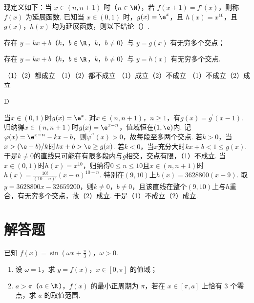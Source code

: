 \begin{problem}
现定义如下：当 \(x\in(n,n+1)\) 时（\(n\in \N\)），若 \(f(x+1)=f'(x)\)，则称 \(f(x)\) 为延展函数. 已知当 \(x\in(0,1)\) 时，\(g(x)=\e^x\)，且 \(h(x)=x^{10}\)，且 \(g(x)\)，\(h(x)\) 均为延展函数，则以下结论（\quad）.

\begin{circlelist}
\item 存在 \(y=kx+b\)（\(k\)，\(b\in\R\)，\(k\)，\(b\ne 0\)）与 \(y=g(x)\) 有无穷多个交点；
\item 存在 \(y=kx+b\)（\(k\)，\(b\in\R\)，\(k\)，\(b\ne 0\)）与 \(y=h(x)\) 有无穷多个交点.
\end{circlelist}

\choices
    {（1）（2）都成立}
    {（1）（2）都不成立}
    {（1）成立（2）不成立}
    {（1）不成立（2）成立}
\end{problem}

\begin{answer}
D
\end{answer}

\begin{solution}
当\(x\in(0,1)\)时\(g(x)=\e^{x}\). 对\(x\in(n,n+1)\)，\(n\ge 1\)，有\(g(x)=g^{\prime}(x-1)\). 归纳得\(x\in(n,n+1)\)时\(g(x)=\e^{x-n}\)，值域恒在\((1,\e)\)内. 记\(\varphi(x)=\e^{x-n}-kx-b\)，则\(\varphi^{\prime\prime}(x)>0\)，故每段至多两个交点. 若\(k>0\)，当\(x>(\e-b)/k\)时\(kx+b>\e\ge g(x)\). 若\(k<0\)，当\(x\)充分大时\(kx+b<1\le g(x)\). 于是\(k\ne 0\)的直线只可能在有限多段内与\(g\)相交，交点有限，（1）不成立. 当\(x\in(0,1)\)时\(h(x)=x^{10}\)，归纳得\(0\le n\le 10\)且\(x\in(n,n+1)\)时\(h(x)=\frac{10!}{(10-n)!}(x-n)^{10-n}\). 特别在\((9,10)\)上\(h(x)=3628800(x-9)\). 取\(y=3628800x-32659200\)，则\(k\ne 0\)，\(b\ne 0\)，且该直线在整个\((9,10)\)上与\(h\)重合，有无穷多个交点，故（2）成立. 于是（1）不成立（2）成立.
\end{solution}
\section{解答题}

\begin{problem}
已知 \(f(x)=\sin\left(\omega x+\frac{\pi}{3}\right)\)，\(\omega>0\).

\begin{enumerate}
\item 设 \(\omega=1\)，求 \(y=f(x)\)，\(x\in[0,\pi]\) 的值域；
\item \(a>\pi\)（\(a\in\R\)），\(f(x)\) 的最小正周期为 \(\pi\)，若在 \(x\in[\pi,a]\) 上恰有 \(3\) 个零点，求 \(a\) 的取值范围.
\end{enumerate}
\end{problem}

